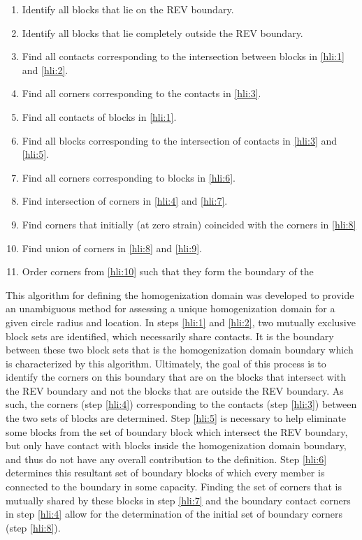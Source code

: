 \begin{enumerate}
	\item \label{hli:1} Identify all blocks that lie on the REV boundary.
	\item \label{hli:2} Identify all blocks that lie completely outside the REV boundary.
	\item \label{hli:3} Find all contacts corresponding to the intersection between blocks in \ref{hli:1} and \ref{hli:2}.
	\item \label{hli:4} Find all corners corresponding to the contacts in \ref{hli:3}.
	\item \label{hli:5} Find all contacts of blocks in \ref{hli:1}.
	\item \label{hli:6} Find all blocks corresponding to the intersection of contacts in \ref{hli:3} and \ref{hli:5}.
	\item \label{hli:7} Find all corners corresponding to blocks in \ref{hli:6}.
	\item \label{hli:8} Find intersection of corners in \ref{hli:4} and \ref{hli:7}.
	\item \label{hli:9}	Find corners that initially (at zero strain) coincided with the corners in \ref{hli:8}
	\item \label{hli:10} Find union of corners in \ref{hli:8} and \ref{hli:9}.
	\item \label{hli:11} Order corners from \ref{hli:10} such that they form the boundary of the 
\end{enumerate}

This algorithm for defining the homogenization domain was developed to provide an unambiguous method for assessing a unique homogenization domain for a given circle radius and location. In steps \ref{hli:1} and \ref{hli:2}, two mutually exclusive block sets are identified, which necessarily share contacts. It is the boundary between these two block sets that is the homogenization domain boundary which is characterized by this algorithm. Ultimately, the goal of this process is to identify the corners on this boundary that are on the blocks that intersect with the REV boundary and not the blocks that are outside the REV boundary. As such, the corners (step \ref{hli:4}) corresponding to the contacts (step \ref{hli:3}) between the two sets of blocks are determined. Step \ref{hli:5} is necessary to help eliminate some blocks from the set of boundary block which intersect the REV boundary, but only have contact with blocks inside the homogenization domain boundary, and thus do not have any overall contribution to the definition. Step \ref{hli:6} determines this resultant set of boundary blocks of which every member is connected to the boundary in some capacity. Finding the set of corners that is mutually shared by these blocks in step \ref{hli:7} and the boundary contact corners in step \ref{hli:4} allow for the determination of the initial set of boundary corners (step \ref{hli:8}). 

